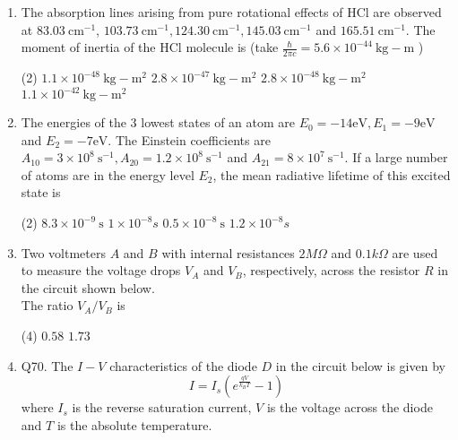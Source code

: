 \begin{enumerate}
 \begin{tasks}(4)
	\task[\textbf{c.}]$1 / 2$
	\task[\textbf{d.}] $3 / 2$
\end{tasks}
\item  The absorption lines arising from pure rotational effects of $\mathrm{HCl}$ are observed at $83.03 \mathrm{~cm}^{-1}$, $103.73 \mathrm{~cm}^{-1}, 124.30 \mathrm{~cm}^{-1}, 145.03 \mathrm{~cm}^{-1}$ and $165.51 \mathrm{~cm}^{-1}$. The moment of inertia of the $\mathrm{HCl}$ molecule is (take $\frac{\hbar}{2 \pi c}=5.6 \times 10^{-44} \mathrm{~kg}-\mathrm{m}$ )
 \begin{tasks}(2)
	\task[\textbf{a.}] $1.1 \times 10^{-48} \mathrm{~kg}-\mathrm{m}^{2}$
	\task[\textbf{b.}]$2.8 \times 10^{-47} \mathrm{~kg}-\mathrm{m}^{2}$
	\task[\textbf{c.}]$2.8 \times 10^{-48} \mathrm{~kg}-\mathrm{m}^{2}$
	\task[\textbf{d.}] $1.1 \times 10^{-42} \mathrm{~kg}-\mathrm{m}^{2}$
\end{tasks}
\item  The energies of the 3 lowest states of an atom are $E_{0}=-14 \mathrm{eV}, E_{1}=-9 \mathrm{eV}$ and $E_{2}=-7 \mathrm{eV}$. The Einstein coefficients are $A_{10}=3 \times 10^{8} \mathrm{~s}^{-1}, A_{20}=1.2 \times 10^{8} \mathrm{~s}^{-1}$ and $A_{21}=8 \times 10^{7} \mathrm{~s}^{-1}$. If a large number of atoms are in the energy level $E_{2}$, the mean radiative lifetime of this excited state is
 \begin{tasks}(2)
	\task[\textbf{a.}] $8.3 \times 10^{-9} \mathrm{~s}$
	\task[\textbf{b.}]$1 \times 10^{-8} s$
	\task[\textbf{c.}]$0.5 \times 10^{-8} \mathrm{~s}$
	\task[\textbf{d.}]$1.2 \times 10^{-8} s$ 
\end{tasks}
\item  Two voltmeters $A$ and $B$ with internal resistances $2 M \Omega$ and $0.1 k \Omega$ are used to measure the voltage drops $V_{A}$ and $V_{B}$, respectively, across the resistor $R$ in the circuit shown below.\\
The ratio $V_{A} / V_{B}$ is
 \begin{tasks}(4)
	\task[\textbf{a.}]$0.58$
	\task[\textbf{b.}] $1.73$
\end{tasks}
\item Q70. The $I-V$ characteristics of the diode $D$ in the circuit below is given by
$$
I=I_{s}\left(e^{\frac{q V}{k_{B} T}}-1\right)
$$
where $I_{s}$ is the reverse saturation current, $V$ is the voltage across the diode and $T$ is the absolute temperature.\\

\end{enumerate}
